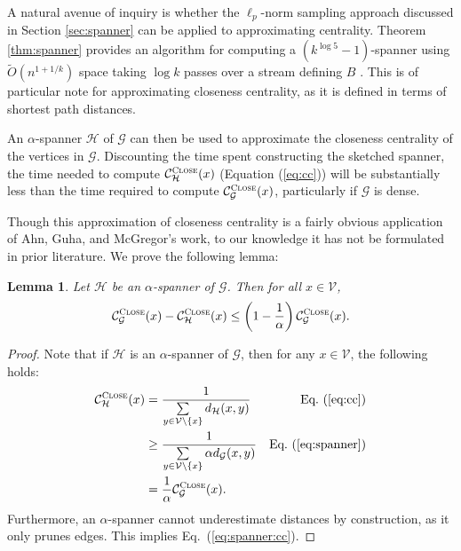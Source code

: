 \documentclass{report}
\newtheorem{lemma}[theorem]{Lemma}
\newcommand{\algoname}[1]{\textnormal{\textsc{#1}}}
\begin{document}


A natural avenue of inquiry is whether the $\ell_p$-norm sampling approach discussed in Section \ref{sec:spanner} can be applied to approximating centrality. 
Theorem \ref{thm:spanner} provides an algorithm for computing a $(k^{\log 5} -1)$-spanner using $\widetilde{O}(n^{1+1/k})$ space taking $\log k$ passes over a stream defining $B$ \cite{ahn2012graph}. 
This is of particular note for approximating closeness centrality, as it is defined in terms of shortest path distances.

An $\alpha$-spanner $\mathcal{H}$ of $\mathcal{G}$ can then be used to approximate the closeness centrality of the vertices in $\mathcal{G}$.
Discounting the time spent constructing the sketched spanner, the time needed to compute $\mathcal{C}^{\algoname{Close}}_{\mathcal{H}}(x)$ (Equation (\ref{eq:cc})) will be substantially less than the time required to compute $\mathcal{C}^{\algoname{Close}}_{\mathcal{G}}(x)$, particularly if $\mathcal{G}$ is dense. 

Though this approximation of closeness centrality is a fairly obvious application of Ahn, Guha, and McGregor's work, to our knowledge it has not be formulated in prior literature. 
We prove the following lemma:

\begin{lemma} \label{lem:spanner:cc}
Let $\mathcal{H}$ be an $\alpha$-spanner of $\mathcal{G}$. 
Then for all $x \in \mathcal{V}$, 
%
\begin{equation} \label{eq:spanner:cc}
\mathcal{C}^{\algoname{Close}}_{\mathcal{G}}(x) - \mathcal{C}^{\algoname{Close}}_{\mathcal{H}}(x) \leq \left ( 1 - \frac{1}{\alpha} \right ) \mathcal{C}^{\algoname{Close}}_{\mathcal{G}}(x).
\end{equation}
%
\end{lemma}
%
\begin{proof}
Note that if $\mathcal{H}$ is an $\alpha$-spanner of $\mathcal{G}$, then for any $x \in \mathcal{V}$, the following holds:
%
\begin{align*}
\mathcal{C}^{\algoname{Close}}_\mathcal{H}(x) 
&= \frac{1}{\sum\limits_{y \in \mathcal{V} \setminus \{x\}} d_\mathcal{H}(x,y)}
&\textnormal{Eq.~(\ref{eq:cc}})\\
&\geq \frac{1}{\sum\limits_{y \in \mathcal{V} \setminus \{x\}} \alpha d_\mathcal{G}(x,y)}
&\textnormal{Eq.~(\ref{eq:spanner}})\\
&= \frac{1}{\alpha}\mathcal{C}^{\algoname{Close}}_\mathcal{G}(x).
\end{align*}
Furthermore, an $\alpha$-spanner cannot underestimate distances by construction, as it only prunes edges.
This implies Eq.~(\ref{eq:spanner:cc}).
\end{proof}
%
\end{document}
